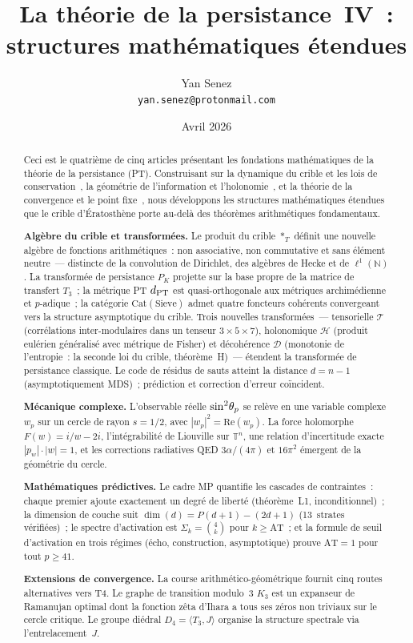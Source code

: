 \documentclass[12pt,a4paper]{article}
\title{\textbf{La théorie de la persistance~IV~:\\
structures mathématiques étendues}}
\author{Yan Senez\\\texttt{yan.senez@protonmail.com}}
\date{Avril 2026}
\begin{document}
\maketitle

\begin{abstract}
Ceci est le quatrième de cinq articles présentant les fondations
mathématiques de la théorie de la persistance (PT). Construisant sur
la dynamique du crible et les lois de
conservation~\cite{companion_M1}, la géométrie de l'information et
l'holonomie~\cite{companion_M2}, et la théorie de la convergence et
le point fixe~\cite{companion_M3}, nous développons les structures
mathématiques étendues que le crible d'Ératosthène porte au-delà des
théorèmes arithmétiques fondamentaux.

\textbf{Algèbre du crible et transformées.}
Le produit du crible $*_T$ définit une nouvelle algèbre de fonctions
arithmétiques~: non associative, non commutative et sans
élément neutre~--- distincte de la convolution de Dirichlet, des
algèbres de Hecke et de $\ell^1(\mathbb{N})$. La transformée de
persistance $P_K$ projette sur la base propre de la matrice de
transfert $T_3$~; la métrique PT $d_{\rm PT}$ est quasi-orthogonale aux
métriques archimédienne et $p$-adique~; la catégorie
$\mathrm{Cat}(\mathrm{Sieve})$ admet quatre foncteurs cohérents
convergeant vers la structure asymptotique du crible. Trois nouvelles
transformées~--- tensorielle $\mathcal{T}$ (corrélations
inter-modulaires dans un tenseur $3{\times}5{\times}7$), holonomique
$\mathcal{H}$ (produit eulérien généralisé avec métrique de Fisher)
et décohérence $\mathcal{D}$ (monotonie de l'entropie~: la seconde
loi du crible, théorème~H)~--- étendent la transformée de persistance
classique. Le code de résidus de sauts atteint la distance $d = n - 1$
(asymptotiquement MDS)~; prédiction et correction d'erreur coïncident.

\textbf{Mécanique complexe.}
L'observable réelle $\sin^2\!\theta_{p}$ se relève en une variable complexe
$w_p$ sur un cercle de rayon $s = 1/2$, avec
$|w_p|^2 = \mathrm{Re}(w_p)$. La force holomorphe $F(w) = i/w - 2i$,
l'intégrabilité de Liouville sur $\mathbb{T}^n$, une relation
d'incertitude exacte $|p_w|\cdot|w| = 1$, et les corrections
radiatives QED $3\alpha/(4\pi)$ et $16\pi^2$ émergent de la géométrie
du cercle.

\textbf{Mathématiques prédictives.}
Le cadre MP quantifie les cascades de contraintes~: chaque premier
ajoute exactement un degré de liberté (théorème~L1, inconditionnel)~;
la dimension de couche suit $\dim(d) = P(d{+}1) - (2d{+}1)$
(13~strates vérifiées)~; le spectre d'activation est
$\Sigma_k = \binom{4}{k}$ pour $k \geq \mathrm{AT}$~; et la formule de
seuil d'activation en trois régimes (écho, construction, asymptotique)
prouve $\mathrm{AT} = 1$ pour tout $p \geq 41$.

\textbf{Extensions de convergence.}
La course arithmético-géométrique fournit cinq routes alternatives vers
T4. Le graphe de transition modulo~3 $K_3$ est un expanseur de
Ramanujan optimal dont la fonction zêta d'Ihara a tous ses zéros non
triviaux sur le cercle critique. Le groupe diédral
$D_4 = \langle T_3, J \rangle$ organise la structure spectrale via
l'entrelacement~$J$.
\end{abstract}
\end{document}
